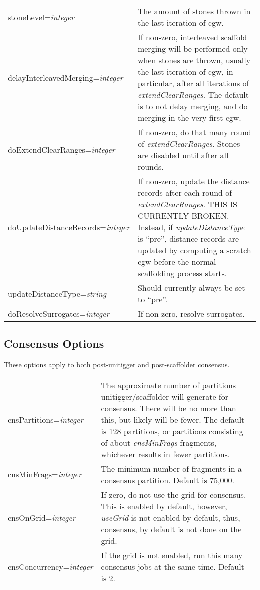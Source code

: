 \documentclass[twoside,11pt]{article}
\begin{document}
\begin{longtable}{lp{3.0in}}
stoneLevel={\it integer} &
The amount of stones thrown in the last iteration of cgw.
\\

delayInterleavedMerging={\it integer} &
If non-zero, interleaved scaffold merging will be performed only when
stones are thrown, usually the last iteration of cgw, in particular,
after all iterations of {\it extendClearRanges}.  The default is to
not delay merging, and do merging in the very first cgw.
\\

doExtendClearRanges={\it integer} &
If non-zero, do that many round of {\it extendClearRanges}.  Stones are disabled
until after all rounds.
\\

doUpdateDistanceRecords={\it integer} &
If non-zero, update the distance records after each round of {\it extendClearRanges}.  THIS IS
CURRENTLY BROKEN.  Instead, if {\it updateDistanceType} is ``pre'', distance records are
updated by computing a scratch cgw before the normal scaffolding process starts.
\\

updateDistanceType={\it string} &
Should currently always be set to ``pre''.
\\

doResolveSurrogates={\it integer} &
If non-zero, resolve surrogates.
\\
\end{longtable}



\subsection{Consensus Options}

These options apply to both post-unitigger and post-scaffolder consensus.

\begin{longtable}{lp{3.0in}}
cnsPartitions={\it integer} &
The approximate number of partitions unitigger/scaffolder will
generate for consensus.  There will be no more than this, but likely
will be fewer.  The default is 128 partitions, or partitions
consisting of about {\it cnsMinFrags} fragments, whichever results in fewer
partitions.
\\

cnsMinFrags={\it integer} &
The minimum number of fragments in a consensus partition.  Default
is 75,000.
\\

cnsOnGrid={\it integer} &
If zero, do not use the grid for consensus.  This is enabled by
default, however, {\em useGrid} is not enabled by default, thus,
consensus, by default is not done on the grid.
\\

cnsConcurrency={\it integer} &
If the grid is not enabled, run this many consensus jobs at the same
time.  Default is 2.
\\

\end{longtable}
\end{document}
